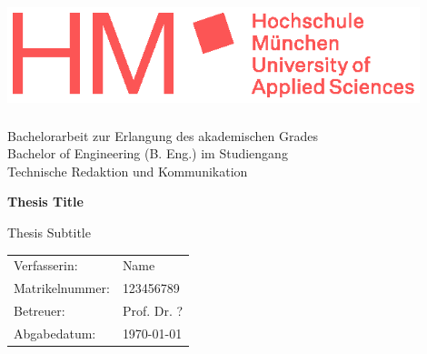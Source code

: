 \begin{titlepage}
			
			\vspace*{1cm}
			
			\begin{center}
				\includegraphics[height=32mm,width=120mm]{logos/HM_Schriftzug_Logo_rot_RGB.eps}
			\vspace*{1cm}
			\begin{center}
				\large{Bachelorarbeit zur Erlangung des akademischen Grades\\
					 Bachelor of Engineering (B. Eng.) im Studiengang\\ Technische Redaktion und Kommunikation}
			\end{center}
		
			\vspace*{1cm}
		
			\begin{center}
				\huge{\textbf{Thesis Title}}
				\end{center}
				\vspace{0.5cm}
				\large{Thesis Subtitle}
				
				\vspace{1.5cm}
				
				\vfill
							
				\vspace{0.8cm}
			
			\end{center}			
			\begin{tabular}{ll}			
			Verfasserin:& Name\\
			Matrikelnummer:& 123456789\\
			Betreuer:& Prof. Dr. ?\\
			Abgabedatum:& \today
			\end{tabular}
	\end{titlepage}